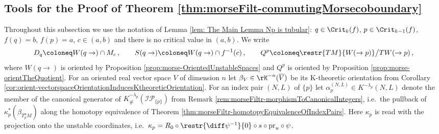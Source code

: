 
\subsection{Tools for the Proof of Theorem \ref{thm:morseFilt-commutingMorsecoboundary}}

Throughout this subsection we use the notation of Lemma \ref{lem: The Main Lemma Np is tubular}: $q\in \Crit_k(f)$, $p\in\Crit_{k-1}(f)$, $f(q)=b$, $f(p)=a$, $c\in (a,b)$ and there is no critical value in $(a,b)$. We write
\begin{equation*}
	D_q\coloneq W(q\to)\cap M_c\,,\qquad
	S(q\to)\coloneq W(q\to)\cap f^{-1}(c)\,,\qquad
	Q^p\coloneq \restr{TM}{W(\to p)}\big/ TW(\to p)\,,
\end{equation*}
where $W(q\to)$ is oriented by Proposition \ref{prop:morse-OrientedUnstableSpaces} and $Q^p$ is oriented by Proposition \ref{prop:morse-orientTheQuotient}. For an oriented real vector space $V$ of dimension $n$ let $\beta_V\in \rK^{-n}(\overline{V})$ be its K-theoretic orientation from Corollary \ref{cor:orient-vectorspaceOrientationInducesKtheoreticOrientation}. For an index pair $(N,L)$ of $\{p\}$ let $\alpha_p^{(N,L)}\in K^{-\lambda_p}(N,L)$ denote the member of the canonical generator of $K^{-\lambda_p}_{\#}(\mathcal{IP}_{\{p\}})$ from Remark \ref{rem:morseFiltr-morphismToCanonicalIntegers}, i.e.\ the pullback of $\kappa_p^*(\beta_{T^u_pM})$ along the homotopy equivalence of Theorem \ref{thm:morseFiltr-homotopyEquivalenceOfIndexPairs}. Here $\kappa_p$ is read with the projection onto the unstable coordinates, i.e.\ $\kappa_p=R_0\circ\restr{\diff\psi^{-1}}{0}\circ s\circ \mathrm{pr}_u\circ\psi$.

